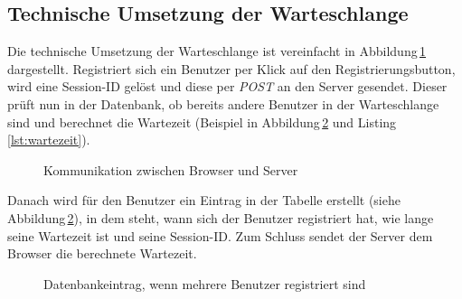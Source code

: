 \subsection{Technische Umsetzung der Warteschlange}
Die technische Umsetzung der Warteschlange ist vereinfacht in Abbildung\,\ref{img:warteschlangeprinzip} dargestellt. Registriert sich ein Benutzer per Klick auf den Registrierungsbutton, wird eine Session-ID gelöst und diese per \emph{POST} an den Server gesendet. Dieser prüft nun in der Datenbank, ob bereits andere Benutzer in der Warteschlange sind und berechnet die Wartezeit (Beispiel in Abbildung\,\ref{img:tblqueuemitBenutzer} und Listing\,\ref{lst:wartezeit}).

\begin{figure}[htbp!]
	\centering
	\caption{Kommunikation zwischen Browser und Server}
	\label{img:warteschlangeprinzip}
\end{figure}

\newpage
\noindent
Danach wird für den Benutzer ein Eintrag in der Tabelle erstellt (siehe Abbildung\,\ref{img:tblqueuemitBenutzer}), in dem steht, wann sich der Benutzer registriert hat, wie lange seine Wartezeit ist und seine Session-ID. Zum Schluss sendet der Server dem Browser die berechnete Wartezeit.

\begin{figure}[htbp!]
	\centering
	\caption{Datenbankeintrag, wenn mehrere Benutzer registriert sind}
	\label{img:tblqueuemitBenutzer}
\end{figure}

